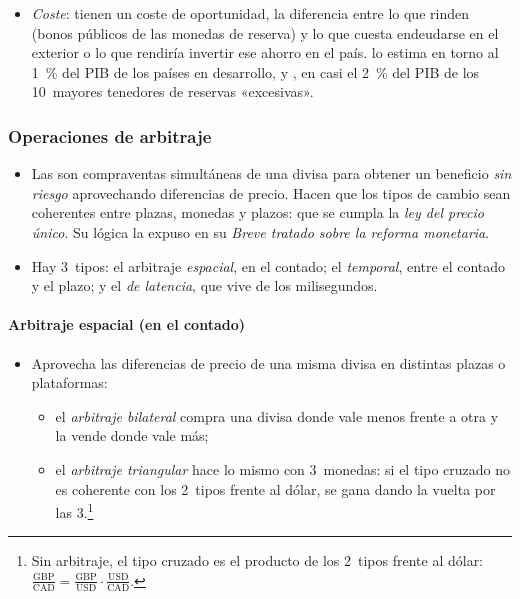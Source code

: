 \documentclass[11pt]{article}
\begin{document}
\begin{itemize}
\item \emph{Coste}: tienen un coste de oportunidad, la diferencia entre lo que rinden (bonos públicos de las monedas de reserva) y lo que cuesta endeudarse en el exterior o lo que rendiría invertir ese ahorro en el país. \textcite{Rodrik2006Social} lo estima en torno al 1~\% del PIB de los países en desarrollo, y \textcite{Summers2006Reflections}, en casi el 2~\% del PIB de los 10~mayores tenedores de reservas «excesivas».
\end{itemize}

\subsubsection{Operaciones de arbitraje}\label{sec:op-arbitraje}

\begin{itemize}
\item Las  son compraventas simultáneas de una divisa para obtener un beneficio \emph{sin riesgo} aprovechando diferencias de precio. Hacen que los tipos de cambio sean coherentes entre plazas, monedas y plazos: que se cumpla la \emph{ley del precio único}. Su lógica la expuso  en su \emph{Breve tratado sobre la reforma monetaria}\nocite{Keynes1923Tract}.
\item Hay 3~tipos: el arbitraje \emph{espacial}, en el contado; el \emph{temporal}, entre el contado y el plazo; y el \emph{de latencia}, que vive de los milisegundos.
\end{itemize}

\paragraph{Arbitraje espacial (en el contado)}

\begin{itemize}
\item Aprovecha las diferencias de precio de una misma divisa en distintas plazas o plataformas:
  \begin{itemize}
  \item el \emph{arbitraje bilateral} compra una divisa donde vale menos frente a otra y la vende donde vale más;
  \item el \emph{arbitraje triangular} hace lo mismo con 3~monedas: si el tipo cruzado no es coherente con los 2~tipos frente al dólar, se gana dando la vuelta por las 3.\footnote{Sin arbitraje, el tipo cruzado es el producto de los 2~tipos frente al dólar: $\frac{\mathrm{GBP}}{\mathrm{CAD}}=\frac{\mathrm{GBP}}{\mathrm{USD}}\cdot\frac{\mathrm{USD}}{\mathrm{CAD}}$\nocite{Gandolfo2002International}.}
  \end{itemize}
\end{itemize}
\end{document}
